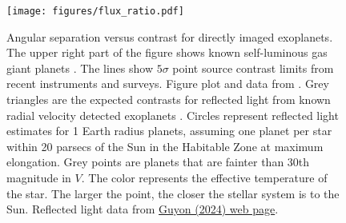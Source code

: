 \documentclass[letterpaper]{ar-1col}
\newcommand{\ld}{$\lambda/D$}
\begin{document}
\begin{figure}[ht]
  \centering
  \texttt{[image: figures/flux\_ratio.pdf]}
  \caption{Angular separation versus contrast for directly imaged exoplanets.
  The upper right part of the figure shows known self-luminous gas giant planets \citep{Lacy20}.
  The lines show  $5\sigma$ point source contrast limits from recent instruments and surveys.
  Figure plot and data from \citet{Bailey24}.
  Grey triangles are the expected contrasts for reflected light from known radial velocity detected exoplanets \citep{Bataltha18}.
  Circles represent reflected light estimates for 1 Earth radius planets, assuming one planet per star within 20 parsecs of the Sun in the Habitable Zone at maximum elongation.
  Grey points are planets that are fainter than 30th magnitude in $V$.
  The color represents the effective temperature of the star.
  The larger the point, the closer the stellar system is to the Sun.
  Reflected light data from \href{https://subarutelescope.org/staff/guyon/04research.web/14hzplanetsELTs.web/catalog.web/content.html}{Guyon (2024) web page}.  
}
\end{figure}
\end{document}

